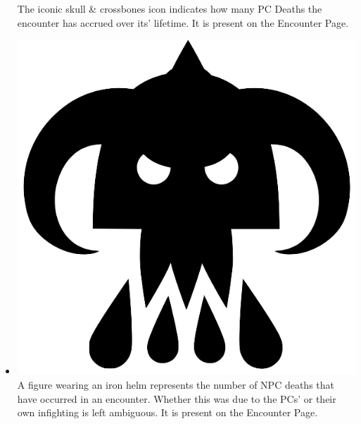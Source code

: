 \documentclass[12pt,a4paper]{report}
\begin{document}
\begin{itemize}
		The iconic skull \& crossbones icon indicates how many PC Deaths the encounter has accrued over its' lifetime. It is present on the Encounter Page.
		\begin{figure}
			\label{fig: PC Deaths Icon}
		\end{figure}
		\item \includegraphics[scale=.03]{npc_deaths}
		A figure wearing an iron helm represents the number of NPC deaths that have occurred in an encounter. Whether this was due to the PCs' or their own infighting is left ambiguous. It is present on the Encounter Page.
		\begin{figure}
			\label{fig: NPC Deaths Icon}
		\end{figure}

\end{itemize}
\end{document}
